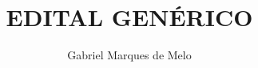 





\def\titulo{EDITAL GENÉRICO}

\title{\titulo}
\author{Gabriel Marques de Melo}



	\initdoc


